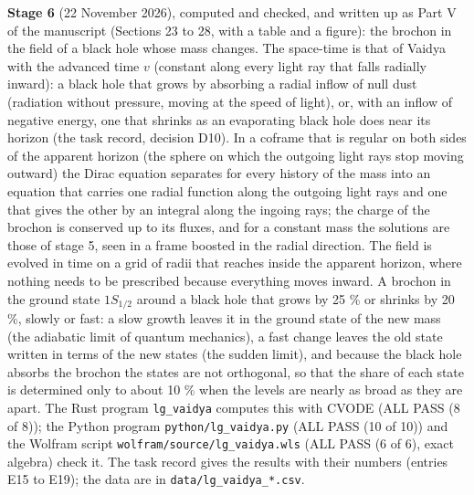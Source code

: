 \documentclass[
  10pt,
]{article}
\begin{document}
\textbf{Stage 6} (22 November 2026), computed and checked, and written
up as Part V of the manuscript (Sections 23 to 28, with a table and a
figure): the brochon in the field of a black hole whose mass changes.
The space-time is that of Vaidya with the advanced time \(v\) (constant
along every light ray that falls radially inward): a black hole that
grows by absorbing a radial inflow of null dust (radiation without
pressure, moving at the speed of light), or, with an inflow of negative
energy, one that shrinks as an evaporating black hole does near its
horizon (the task record, decision D10). In a coframe that is regular on
both sides of the apparent horizon (the sphere on which the outgoing
light rays stop moving outward) the Dirac equation separates for every
history of the mass into an equation that carries one radial function
along the outgoing light rays and one that gives the other by an
integral along the ingoing rays; the charge of the brochon is conserved
up to its fluxes, and for a constant mass the solutions are those of
stage 5, seen in a frame boosted in the radial direction. The field is
evolved in time on a grid of radii that reaches inside the apparent
horizon, where nothing needs to be prescribed because everything moves
inward. A brochon in the ground state \(1S_{1/2}\) around a black hole
that grows by 25 \% or shrinks by 20 \%, slowly or fast: a slow growth
leaves it in the ground state of the new mass (the adiabatic limit of
quantum mechanics), a fast change leaves the old state written in terms
of the new states (the sudden limit), and because the black hole absorbs
the brochon the states are not orthogonal, so that the share of each
state is determined only to about 10 \% when the levels are nearly as
broad as they are apart. The Rust program \texttt{lg\_vaidya} computes
this with CVODE (ALL PASS (8 of 8)); the Python program
\texttt{python/lg\_vaidya.py} (ALL PASS (10 of 10)) and the Wolfram
script \texttt{wolfram/source/lg\_vaidya.wls} (ALL PASS (6 of 6), exact
algebra) check it. The task record gives the results with their numbers
(entries E15 to E19); the data are in \texttt{data/lg\_vaidya\_*.csv}.
\end{document}
